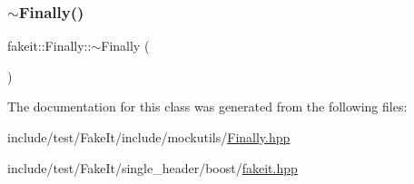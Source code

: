\mbox{\label{classfakeit_1_1Finally_ac8854be9f73fc8d52334f0e71d6da413}} 
\subsubsection{\texorpdfstring{$\sim$Finally()}{~Finally()}\hspace{0.1cm}{\footnotesize\ttfamily [9/9]}}
{\footnotesize\ttfamily fakeit\+::\+Finally\+::$\sim$\+Finally (\begin{DoxyParamCaption}{ }\end{DoxyParamCaption})\hspace{0.3cm}{\ttfamily [inline]}}



The documentation for this class was generated from the following files\+:\begin{DoxyCompactItemize}
\item 
include/test/\+Fake\+It/include/mockutils/\mbox{\hyperlink{Finally_8hpp}{Finally.\+hpp}}\item 
include/test/\+Fake\+It/single\+\_\+header/boost/\mbox{\hyperlink{single__header_2boost_2fakeit_8hpp}{fakeit.\+hpp}}\end{DoxyCompactItemize}
